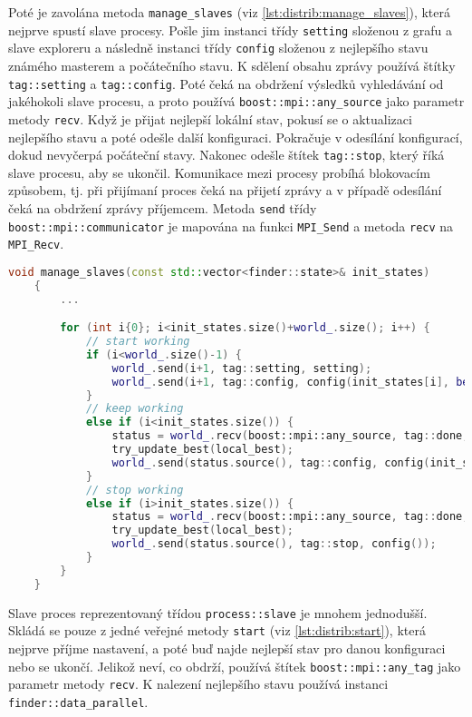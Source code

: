 Poté je zavolána metoda \texttt{manage\_slaves} (viz \ref{lst:distrib:manage_slaves}), která nejprve spustí slave procesy.
Pošle jim instanci třídy \texttt{setting} složenou z grafu a slave exploreru a následně instanci třídy \texttt{config} složenou z nejlepšího stavu známého masterem a počátečního stavu.
K sdělení obsahu zprávy používá štítky \texttt{tag::setting} a \texttt{tag::config}.
Poté čeká na obdržení výsledků vyhledávání od jakéhokoli slave procesu, a proto používá \texttt{boost::mpi::any\_source} jako parametr metody \texttt{recv}.
Když je přijat nejlepší lokální stav, pokusí se o aktualizaci nejlepšího stavu a poté odešle další konfiguraci.
Pokračuje v odesílání konfigurací, dokud nevyčerpá počáteční stavy.
Nakonec odešle štítek \texttt{tag::stop}, který říká slave procesu, aby se ukončil.
Komunikace mezi procesy probíhá blokovacím způsobem, tj. při přijímaní proces čeká na přijetí zprávy a v případě odesílání čeká na obdržení zprávy příjemcem.
Metoda \texttt{send} třídy \texttt{boost::mpi::communicator} je mapována na funkci \texttt{MPI\_Send} a metoda \texttt{recv} na \texttt{MPI\_Recv}.

\begin{lstlisting}[language=C++, label={lst:distrib:manage_slaves}, caption={Metoda pro obstarání slave procesů}]
    void manage_slaves(const std::vector<finder::state>& init_states)
    {
        ...

        for (int i{0}; i<init_states.size()+world_.size(); i++) {
            // start working
            if (i<world_.size()-1) {
                world_.send(i+1, tag::setting, setting);
                world_.send(i+1, tag::config, config(init_states[i], best_));
            }
            // keep working
            else if (i<init_states.size()) {
                status = world_.recv(boost::mpi::any_source, tag::done, local_best);
                try_update_best(local_best);
                world_.send(status.source(), tag::config, config(init_states[i], best_));
            }
            // stop working
            else if (i>init_states.size()) {
                status = world_.recv(boost::mpi::any_source, tag::done, local_best);
                try_update_best(local_best);
                world_.send(status.source(), tag::stop, config());
            }
        }
    }
\end{lstlisting}

Slave proces reprezentovaný třídou \texttt{process::slave} je mnohem jednodušší.
Skládá se pouze z jedné veřejné metody \texttt{start} (viz \ref{lst:distrib:start}), která nejprve příjme nastavení, a poté buď najde nejlepší stav pro danou konfiguraci nebo se ukončí.
Jelikož neví, co obdrží, používá štítek \texttt{boost::mpi::any\_tag} jako parametr metody \texttt{recv}.
K nalezení nejlepšího stavu používá instanci \texttt{finder::data\_parallel}.

